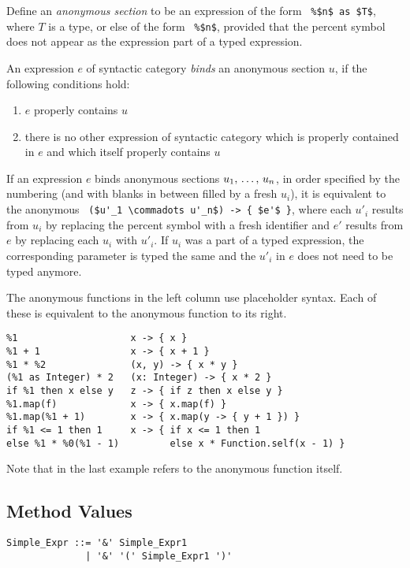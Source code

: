 Define an {\em anonymous section} to be an expression of the form ~\lstinline!%$n$ as $T$!, where $T$ is a type, or else of the form ~\lstinline!%$n$!, provided that the percent symbol does not appear as the expression part of a typed expression. 

An expression $e$ of syntactic category  {\em binds} an anonymous section $u$, if the following conditions hold:
\begin{enumerate}
  \item $e$ properly contains $u$
  \item there is no other expression of syntactic category  which is properly contained in $e$ and which itself properly contains $u$
\end{enumerate}

If an expression $e$ binds anonymous sections $u_1 ,\, \ldots ,\, u_n$, in order specified by the numbering (and with blanks in between filled by a fresh $u_i$), it is equivalent to the anonymous ~\lstinline!($u'_1 \commadots u'_n$) -> { $e'$ }!, where each $u'_i$ results from $u_i$ by replacing the percent symbol with a fresh identifier and $e'$ results from $e$ by replacing each $u_i$ with $u'_i$. If $u_i$ was a part of a typed expression, the corresponding parameter is typed the same and the $u'_i$ in $e$ does not need to be typed anymore. 

\example The anonymous functions in the left column use placeholder syntax. Each of these is equivalent to the anonymous function to its right. 
\begin{lstlisting}
%1                    x -> { x }
%1 + 1                x -> { x + 1 }
%1 * %2               (x, y) -> { x * y }
(%1 as Integer) * 2   (x: Integer) -> { x * 2 }
if %1 then x else y   z -> { if z then x else y }
%1.map(f)             x -> { x.map(f) }
%1.map(%1 + 1)        x -> { x.map(y -> { y + 1 }) }
if %1 <= 1 then 1     x -> { if x <= 1 then 1 
else %1 * %0(%1 - 1)         else x * Function.self(x - 1) }     
\end{lstlisting}
Note that  in the last example refers to the anonymous function itself. 





\subsection{Method Values}
\label{sec:method-values}

\syntax\begin{lstlisting}
Simple_Expr ::= '&' Simple_Expr1
              | '&' '(' Simple_Expr1 ')'
\end{lstlisting}


